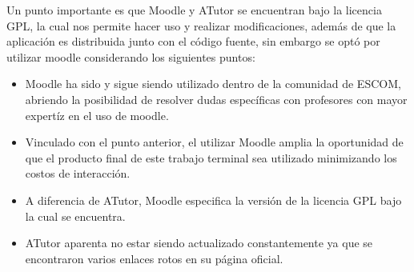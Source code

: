  \noindent Un punto importante es que Moodle y ATutor se encuentran bajo la licencia GPL,
 la cual nos permite hacer uso y realizar modificaciones, además de que la aplicación es
 distribuida junto con el código fuente, sin embargo se optó por utilizar moodle considerando
 los siguientes puntos:

    \begin{itemize}
        \item Moodle ha sido y sigue siendo utilizado dentro de la comunidad de ESCOM,
              abriendo la posibilidad de resolver dudas específicas con profesores con
              mayor expertíz en el uso de moodle.

        \item Vinculado con el punto anterior, el utilizar Moodle amplia la oportunidad
              de que el producto final de este trabajo terminal sea utilizado minimizando
              los costos de interacción.

        \item A diferencia de ATutor, Moodle especifica la versión de la licencia GPL
              bajo la cual se encuentra.

        \item ATutor aparenta no estar siendo actualizado constantemente ya que se
              encontraron varios enlaces rotos en su página oficial.
    \end{itemize}






